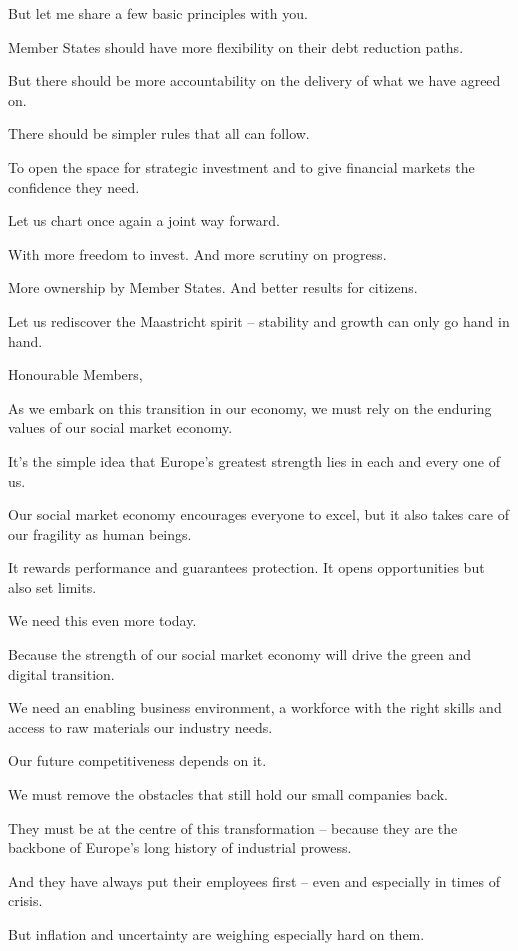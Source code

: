 \documentclass[a4paper,11pt]{article}
\begin{document}
But let me share a few basic principles with you.

Member States should have more flexibility on their debt reduction paths.

But there should be more accountability on the delivery of what we have agreed on.

There should be simpler rules that all can follow.

To open the space for strategic investment and to give financial markets the confidence they need.

Let us chart once again a joint way forward.

With more freedom to invest. And more scrutiny on progress.

More ownership by Member States. And better results for citizens.

Let us rediscover the Maastricht spirit – stability and growth can only go hand in hand.

 

Honourable Members,

As we embark on this transition in our economy, we must rely on the enduring values of our social market economy.

It's the simple idea that Europe's greatest strength lies in each and every one of us.

Our social market economy encourages everyone to excel, but it also takes care of our fragility as human beings.

It rewards performance and guarantees protection. It opens opportunities but also set limits.

We need this even more today.

Because the strength of our social market economy will drive the green and digital transition.

We need an enabling business environment, a workforce with the right skills and access to raw materials our industry needs.

 

Our future competitiveness depends on it.

We must remove the obstacles that still hold our small companies back.

They must be at the centre of this transformation – because they are the backbone of Europe's long history of industrial prowess.

And they have always put their employees first – even and especially in times of crisis.

But inflation and uncertainty are weighing especially hard on them.
\end{document}
